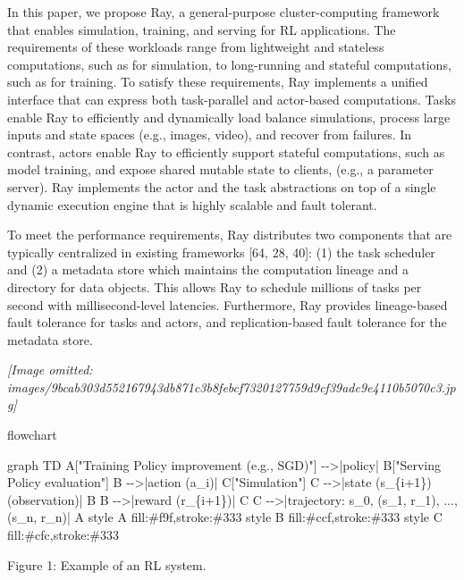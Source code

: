 \documentclass[
]{article}
\newenvironment{Shaded}{}{}
\newcommand{\NormalTok}[1]{#1}
\begin{document}
In this paper, we propose Ray, a general-purpose cluster-computing
framework that enables simulation, training, and serving for RL
applications. The requirements of these workloads range from lightweight
and stateless computations, such as for simulation, to long-running and
stateful computations, such as for training. To satisfy these
requirements, Ray implements a unified interface that can express both
task-parallel and actor-based computations. Tasks enable Ray to
efficiently and dynamically load balance simulations, process large
inputs and state spaces (e.g., images, video), and recover from
failures. In contrast, actors enable Ray to efficiently support stateful
computations, such as model training, and expose shared mutable state to
clients, (e.g., a parameter server). Ray implements the actor and the
task abstractions on top of a single dynamic execution engine that is
highly scalable and fault tolerant.

To meet the performance requirements, Ray distributes two components
that are typically centralized in existing frameworks {[}64, 28, 40{]}:
(1) the task scheduler and (2) a metadata store which maintains the
computation lineage and a directory for data objects. This allows Ray to
schedule millions of tasks per second with millisecond-level latencies.
Furthermore, Ray provides lineage-based fault tolerance for tasks and
actors, and replication-based fault tolerance for the metadata store.

\textit{[Image omitted: images/9bcab303d552167943db871c3b8febcf7320127759d9cf39adc9e4110b5070c3.jpg]}

flowchart

\begin{Shaded}
\begin{Highlighting}[]
\NormalTok{graph TD}
\NormalTok{    A["Training Policy improvement (e.g., SGD)"] {-}{-}\textgreater{}|policy| B["Serving Policy evaluation"]}
\NormalTok{    B {-}{-}\textgreater{}|action (a\_i)| C["Simulation"]}
\NormalTok{    C {-}{-}\textgreater{}|state (s\_\{i+1\}) (observation)| B}
\NormalTok{    B {-}{-}\textgreater{}|reward (r\_\{i+1\})| C}
\NormalTok{    C {-}{-}\textgreater{}|trajectory: s\_0, (s\_1, r\_1), ..., (s\_n, r\_n)| A}
\NormalTok{    style A fill:\#f9f,stroke:\#333}
\NormalTok{    style B fill:\#ccf,stroke:\#333}
\NormalTok{    style C fill:\#cfc,stroke:\#333}
\end{Highlighting}
\end{Shaded}

Figure 1: Example of an RL system.
\end{document}
